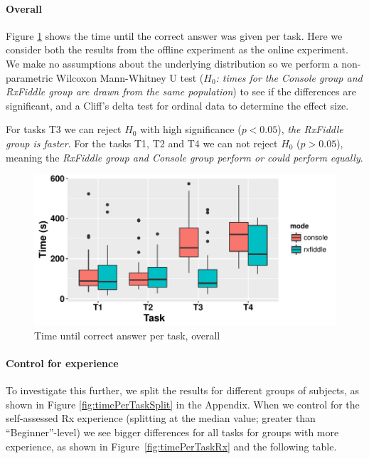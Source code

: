 \paragraph{Overall}
Figure \ref{fig:timePerTask} shows the time until the correct answer was given per task. Here we consider both the results from the offline experiment as the online experiment. We make no assumptions about the underlying distribution so we perform a non-parametric Wilcoxon Mann-Whitney U test (\textit{$H_0$: times for the Console group and RxFiddle group are drawn from the same population}) to see if the differences are significant, and a Cliff's delta test for ordinal data to determine the effect size.

\begin{centering}

\end{centering}

For tasks T3 we can reject $H_0$ with high significance ($p < 0.05$), \emph{the RxFiddle group is faster}.
For the tasks T1, T2 and T4 we can not reject $H_0$ ($p > 0.05$), meaning the \emph{RxFiddle group and Console group perform or could perform equally}.

\begin{figure}[t]
\includegraphics[width=\columnwidth]{images/timePerTask.pdf}
\caption{Time until correct answer per task, overall}
\label{fig:timePerTask}
\end{figure}

\paragraph{Control for experience}
To investigate this further, we split the results for different groups of subjects, as shown in Figure \ref{fig:timePerTaskSplit} in the Appendix.
When we control for the self-assessed Rx experience (splitting at the median value; greater than ``Beginner''-level) we see bigger differences for all tasks for groups with more experience, as shown in Figure~\ref{fig:timePerTaskRx} and the following table.

